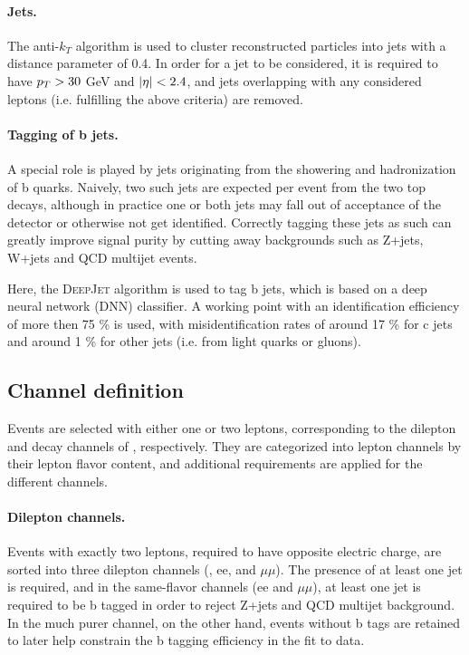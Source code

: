 \paragraph{Jets.}

The anti-$k_T$ algorithm is used to cluster reconstructed particles into jets with a distance parameter of 0.4. In order for a jet to be considered, it is required to have $p_T > 30$ GeV and $|\eta| < 2.4$, and jets overlapping with any considered leptons (i.e. fulfilling the above criteria) are removed. %

\paragraph{Tagging of b jets.}

A special role is played by jets originating from the showering and hadronization of b quarks. Naively, two such jets are expected per \ttbar event from the two top decays, although in practice one or both jets may fall out of acceptance of the detector or otherwise not get identified. Correctly tagging these jets as such can greatly improve signal purity by cutting away backgrounds such as Z+jets, W+jets and QCD multijet events.

Here, the \textsc{DeepJet} algorithm is used to tag b jets, which is based on a deep neural network (DNN) classifier. A working point with an identification efficiency of more then 75 \% is used, with misidentification rates of around 17 \% for c jets and around 1 \% for other jets (i.e. from light quarks or gluons).

\subsection{Channel definition}

Events are selected with either one or two leptons, corresponding to the dilepton and \ljets decay channels of \ttbar, respectively. They are categorized into lepton channels by their lepton flavor content, and additional requirements are applied for the different channels. 

\paragraph{Dilepton channels.}

Events with exactly two leptons, required to have opposite electric charge, are sorted into three dilepton channels (\emu, ee, and $\mu\mu$). The presence of at least one jet is required, and in the same-flavor channels (ee and $\mu\mu$), at least one jet is required to be b tagged in order to reject Z+jets and QCD multijet background. In the much purer \emu channel, on the other hand, events without b tags are retained to later help constrain the b tagging efficiency in the fit to data.

